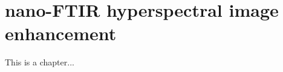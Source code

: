\chapter{nano-FTIR hyperspectral image enhancement}
\nopagebreak
\label{chap:chapter_6}
\thispagestyle{empty}

This is a chapter...


\clearpage
